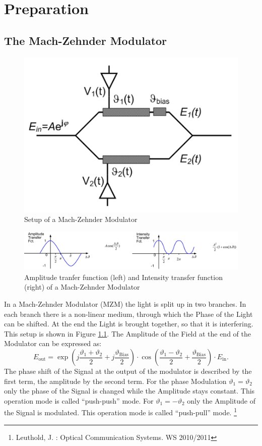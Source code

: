 
\chapter{Preparation}
\section{The Mach-Zehnder Modulator}
\label{sec:MZM}
\begin{figure}[h]
  \centering
  \includegraphics[width=.5\columnwidth]{Grafiken/Mach-Zehnder.jpg}

\caption{Setup of a Mach-Zehnder Modulator}
\label{fig:MZI}
\end{figure}
\begin{figure}[ht]
  \centering
  \includegraphics[width=\columnwidth]{Grafiken/Mach-Zender-Transfer1.jpg}

\caption{Amplitude tranfer function (left) and Intensity transfer function (right) of a Mach-Zehnder Modulator }
\label{fig:MZI_plot}
\end{figure}


In a Mach-Zehnder Modulator (MZM) the light is split up in two branches. In each branch there is a non-linear medium, through which the Phase of the Light can be shifted. At the end the Light is brought together, so that it is interfering. This setup is shown in Figure \ref{fig:MZI}. The Amplitude of the Field at the end of the Modulator can be expressed as:
\begin{equation}
 E_{\mathrm{out}}=\exp\left(j\frac{\vartheta_1+\vartheta_2}{2}+j\frac{\vartheta_{\mathrm{Bias}}}{2} \right)\cdot\cos\left(\frac{\vartheta_1-\vartheta_2}{2}+\frac{\vartheta_{\mathrm{Bias}}}{2}\right)\cdot E_{\mathrm{in}} .
\end{equation}
The phase shift of the Signal at the output of the modulator is described by the first term, the amplitude by the second term. For the phase Modulation $\vartheta_1 = \vartheta_2$ only the phase of the Signal is changed while the Amplitude stays constant. This operation mode is called "`push-push"' mode. For $\vartheta_1 = -\vartheta_2$ only the Amplitude of the Signal is modulated. This operation mode is called "`push-pull"' mode. \footnote[1]{Leuthold, J. : Optical Communication Systems. WS 2010/2011}



